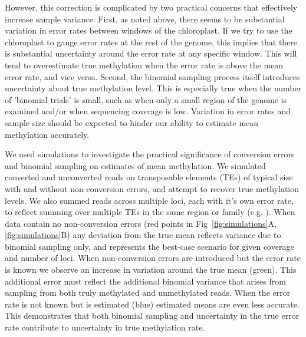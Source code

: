 \documentclass[10pt,letterpaper]{article}
\begin{document}
However, this correction is complicated by two practical concerns that effectively increase sample variance.
First, as noted above, there seems to be substantial variation in error rates between windows of the chloroplast.
If we try to use the chloroplast to gauge error rates at the rest of the genome, this implies that there is substantial uncertainty around the error rate at any specific window.
This will tend to overestimate true methylation when the error rate is above the mean error rate, and vice versa.
Second, the binomial sampling process itself introduces uncertainty about true methylation level.
This is especially true when the number of 'binomial trials' is small, such as when only a small region of the genome is examined and/or when sequencing coverage is low.
Variation in error rates and sample size should be expected to hinder our ability to estimate mean methylation accurately.

We used simulations to investigate the practical significance of conversion errors and binomial sampling on estimates of mean methylation.
We simulated converted and unconverted reads on transposable elements (TEs) of typical size with and without non-conversion errors, and attempt to recover true methylation levels.
We also summed reads across multiple loci, each with it's own error rate, to reflect summing over multiple TEs in the same region or family (e.g. \cite{sasaki2019common}).
When data contain no non-conversion errors (red points in Fig~\ref{fig:simulations}A, \ref{fig:simulations}B) any deviation from the true mean reflects variance due to binomial sampling only, and represents the best-case scenario for given coverage and number of loci.
When non-conversion errors are introduced but the error rate is known we observe an increase in variation around the true mean (green).
This additional error must reflect the additional binomial variance that arises from sampling from both truly methylated and unmethylated reads.
When the error rate is not known but is estimated (blue) estimated means are even less accurate.
This demonstrates that both binomial sampling and uncertainty in the true error rate contribute to uncertainty in true methylation rate.
\end{document}

